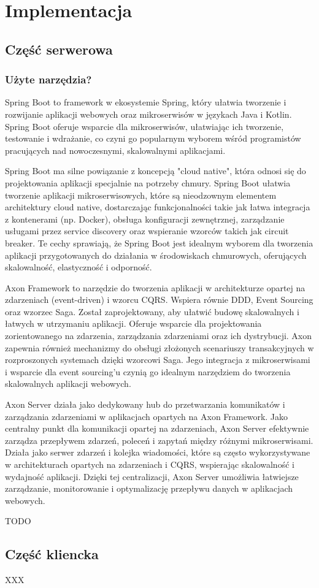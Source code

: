 \clearpage %

\section{Implementacja}

\subsection{Część serwerowa}

\subsubsection{Użyte narzędzia?}

Spring Boot to framework w ekosystemie Spring, który ułatwia tworzenie i rozwijanie aplikacji webowych oraz mikroserwisów w językach Java i Kotlin. Spring Boot oferuje wsparcie dla mikroserwisów, ułatwiając ich tworzenie, testowanie i wdrażanie, co czyni go popularnym wyborem wśród programistów pracujących nad nowoczesnymi, skalowalnymi aplikacjami.

Spring Boot ma silne powiązanie z koncepcją "cloud native", która odnosi się do projektowania aplikacji specjalnie na potrzeby chmury. Spring Boot ułatwia tworzenie aplikacji mikroserwisowych, które są nieodzownym elementem architektury cloud native, dostarczając funkcjonalności takie jak łatwa integracja z kontenerami (np. Docker), obsługa konfiguracji zewnętrznej, zarządzanie usługami przez service discovery oraz wspieranie wzorców takich jak circuit breaker. Te cechy sprawiają, że Spring Boot jest idealnym wyborem dla tworzenia aplikacji przygotowanych do działania w środowiskach chmurowych, oferujących skalowalność, elastyczność i odporność.

Axon Framework to narzędzie do tworzenia aplikacji w architekturze opartej na zdarzeniach (event-driven) i wzorcu CQRS. Wspiera równie DDD, Event Sourcing oraz wzorzec Saga. Został zaprojektowany, aby ułatwić budowę skalowalnych i łatwych w utrzymaniu aplikacji. Oferuje wsparcie dla projektowania zorientowanego na zdarzenia, zarządzania zdarzeniami oraz ich dystrybucji. Axon zapewnia również mechanizmy do obsługi złożonych scenariuszy transakcyjnych w rozproszonych systemach dzięki wzorcowi Saga. Jego integracja z mikroserwisami i wsparcie dla event sourcing'u czynią go idealnym narzędziem do tworzenia skalowalnych aplikacji webowych.

Axon Server działa jako dedykowany hub do przetwarzania komunikatów i zarządzania zdarzeniami w aplikacjach opartych na Axon Framework. Jako centralny punkt dla komunikacji opartej na zdarzeniach, Axon Server efektywnie zarządza przepływem zdarzeń, poleceń i zapytań między różnymi mikroserwisami. Działa jako serwer zdarzeń i kolejka wiadomości, które są często wykorzystywane w architekturach opartych na zdarzeniach i CQRS, wspierając skalowalność i wydajność aplikacji. Dzięki tej centralizacji, Axon Server umożliwia łatwiejsze zarządzanie, monitorowanie i optymalizację przepływu danych w aplikacjach webowych.

TODO

\subsection{Część kliencka}

XXX